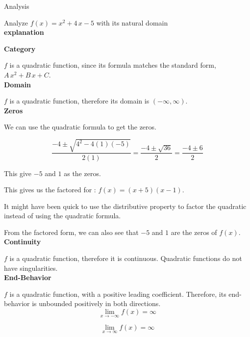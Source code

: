 \documentclass{ximera}
\begin{document}
\begin{example}   
Analysis


Analyze $f(x) = x^2 + 4 \, x - 5$ with its natural domain    \\ 




\textbf{\textcolor{red!75!green}{explanation}} 





\textbf{Category}


$f$ is a quadratic function, since its formula matches the standard form, $A \, x^2 + B \, x + C$. \\






\textbf{Domain}

$f$ is a quadratic function, therefore its domain is $(-\infty, \infty)$. \\



\textbf{Zeros}


We can use the quadratic formula to get the zeros.

\[
\frac{-4 \pm \sqrt{4^2 - 4(1)(-5)}}{2(1)} = \frac{-4 \pm \sqrt{36}}{2} = \frac{-4 \pm 6}{2}
\]

This give $-5$ and $1$ as the zeros.

This gives us the factored for : $f(x) = (x+5)(x-1)$.


It might have been quick to use the distributive property to factor the quadratic instead of using the quadratic formula. 

From the factored form, we can also see that $-5$ and $1$ are the zeros of $f(x)$.  \\


\textbf{Continuity}

$f$ is a quadratic function, therefore it is continuous. Quadratic functions do not have singularities.\\



\textbf{End-Behavior}

$f$ is a quadratic function, with a positive leading coefficient. Therefore, its end-behavior is unbounded positively in both directions. \\

\[
\lim\limits_{x \to -\infty} f(x) = \infty 
\]


\[
\lim\limits_{x \to \infty} f(x) = \infty 
\]





\end{example}
\end{document}
